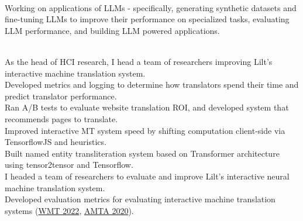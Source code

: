 
\\
Working on applications of LLMs - specifically, generating synthetic datasets and fine-tuning LLMs to improve their performance on specialized tasks, evaluating LLM performance, and building LLM powered applications.\\

\vspace{-1mm}

\\
\ifdefined\hci
As the head of HCI research, I head a team of researchers improving Lilt's interactive machine translation system.\\
Developed metrics and logging to determine how translators spend their time and predict translator performance.\\
Ran A/B tests to evaluate website translation ROI, and developed system that recommends pages to translate. \\
Improved interactive MT system speed by shifting computation client-side via TensorflowJS and heuristics.\\
Built named entity transliteration system based on Transformer architecture using tensor2tensor and Tensorflow.\\  
\else
I headed a team of researchers to evaluate and improve Lilt's interactive neural machine translation system.\\
Developed evaluation metrics for evaluating interactive machine translation systems (\href{https://aclanthology.org/2022.wmt-1.75.pdf}{WMT 2022}, \href{https://aclanthology.org/2020.amta-impact.7/}{AMTA 2020}).\\
